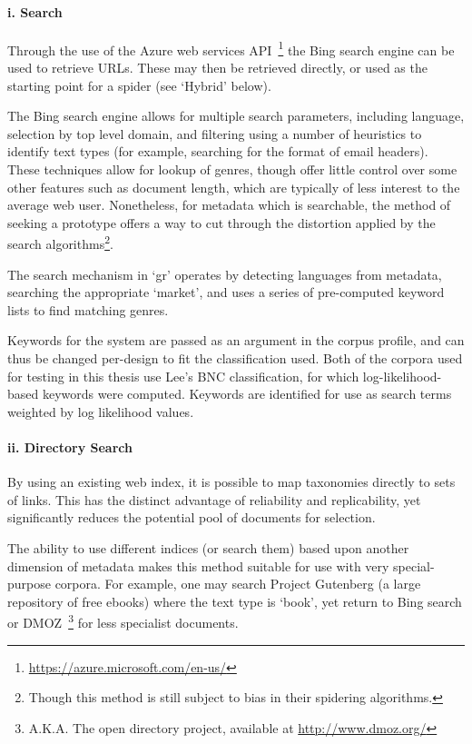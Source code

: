 \paragraph{i. Search}
Through the use of the Azure web services API~\footnote{\url{https://azure.microsoft.com/en-us/}} the Bing search engine can be used to retrieve URLs.  These may then be retrieved directly, or used as the starting point for a spider (see `Hybrid' below).

The Bing search engine allows for multiple search parameters, including language, selection by top level domain, and filtering using a number of heuristics to identify text types (for example, searching for the format of email headers).  These techniques allow for lookup of genres, though offer little control over some other features such as document length, which are typically of less interest to the average web user.  Nonetheless, for metadata which is searchable, the method of seeking a prototype offers a way to cut through the distortion applied by the search algorithms\footnote{Though this method is still subject to bias in their spidering algorithms.}.

The search mechanism in `gr' operates by detecting languages from metadata, searching the appropriate `market', and uses a series of pre-computed keyword lists to find matching genres.

Keywords for the system are passed as an argument in the corpus profile, and can thus be changed per-design to fit the classification used.  Both of the corpora used for testing in this thesis use Lee's BNC classification, for which log-likelihood-based keywords were computed.  Keywords are identified for use as search terms weighted by log likelihood values.


\paragraph{ii. Directory Search}
By using an existing web index, it is possible to map taxonomies directly to sets of links.  This has the distinct advantage of reliability and replicability, yet significantly reduces the potential pool of documents for selection.

The ability to use different indices (or search them) based upon another dimension of metadata makes this method suitable for use with very special-purpose corpora.  For example, one may search Project Gutenberg (a large repository of free ebooks) where the text type is `book', yet return to Bing search or DMOZ~\footnote{A.K.A. The open directory project, available at \url{http://www.dmoz.org/}} for less specialist documents.

